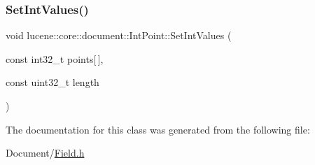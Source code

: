 \subsubsection{\texorpdfstring{Set\+Int\+Values()}{SetIntValues()}}
{\footnotesize\ttfamily void lucene\+::core\+::document\+::\+Int\+Point\+::\+Set\+Int\+Values (\begin{DoxyParamCaption}\item[{const int32\+\_\+t}]{points\mbox{[}$\,$\mbox{]},  }\item[{const uint32\+\_\+t}]{length }\end{DoxyParamCaption})\hspace{0.3cm}{\ttfamily [inline]}}



The documentation for this class was generated from the following file\+:\begin{DoxyCompactItemize}
\item 
Document/\mbox{\hyperlink{Document_2Field_8h}{Field.\+h}}\end{DoxyCompactItemize}
